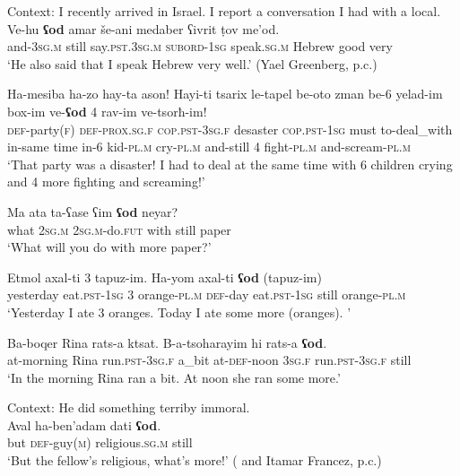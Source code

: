 \pagebreak
\begin{exe}
	\ex\label{exAppendixHebrewOdAdditive1}
	Context: I recently arrived in Israel. I report a conversation I had with a local.\\
	\gll Ve-hu \textbf{ʕod} amar še-ani medaber ʕivrit ṭov me'od.\\
	and-3\textsc{sg}.\textsc{m} still say.\textsc{pst}.3\textsc{sg}.\textsc{m} \textsc{subord}-1\textsc{sg} speak.\textsc{sg}.\textsc{m} Hebrew good very\\
	\glt \lq He also said that I speak Hebrew very well.' (Yael Greenberg, p.c.)

	\ex\label{exAppendixHebrewOdAdditive2}
	\gll Ha-mesiba ha-zo hay-ta ason! Hayi-ti tsarix le-tapel be-oto zman be-6 yelad-im box-im ve-\textbf{ʕod} 4 rav-im ve-tsorħ-im!\\
	\textsc{def}-party(\textsc{f}) \textsc{def}-\textsc{prox}.\textsc{sg}.\textsc{f} \textsc{cop}.\textsc{pst}-3\textsc{sg}.\textsc{f} desaster \textsc{cop}.\textsc{pst}-1\textsc{sg} must to-deal\_with in-same time in-6 kid-\textsc{pl}.\textsc{m} cry-\textsc{pl}.\textsc{m} and-still 4 fight-\textsc{pl}.\textsc{m} and-scream-\textsc{pl}.\textsc{m}\\
	\glt \lq That party was a disaster! I had to deal at the same time with 6 children crying and 4 more fighting and screaming!' \parencite[132]{Greenberg2012}
	
	\ex\label{exAppendixHebrewOdAdditive3}
	\gll Ma ata ta-ʕase ʕim \textbf{ʕod} neyar?\\
	what 2\textsc{sg}.\textsc{m} 2\textsc{sg}.\textsc{m}-do.\textsc{fut} with still paper\\
	\glt \lq What will you do with more paper?\rq{ }\parencite[249]{Glinert1976}
	
	\ex\label{exAppendixHebrewOdAdditive4}
	\gll Etmol axal-ti 3 tapuz-im. Ha-yom axal-ti \textbf{ʕod} (tapuz-im)\\
	yesterday eat.\textsc{pst}-1\textsc{sg} 3 orange-\textsc{pl}.\textsc{m} \textsc{def}-day eat.\textsc{pst}-1\textsc{sg} still \phantom{(}orange-\textsc{pl}.\textsc{m}\\
	\glt \lq Yesterday I ate 3 oranges. Today I ate some more (oranges).
	\rq{ }\parencite[127]{Greenberg2012}
		
	\ex\label{exAppendixHebrewOdAdditive5}
	\gll Ba-boqer Rina rats-a ktsat. B-a-tsoharayim hi rats-a \textbf{ʕod}.\\
	at-morning Rina run.\textsc{pst}-3\textsc{sg}.\textsc{f} a\_bit at-\textsc{def}-noon 3\textsc{sg}.\textsc{f} run.\textsc{pst}-3\textsc{sg}.\textsc{f} still\\
	\glt \lq In the morning Rina ran a bit. At noon she ran some more.\rq{ }\parencite[127]{Greenberg2012}
	
	\ex\label{exAppendixHebrewOdAdditive6}
	Context: He did something terriby immoral.\\
	\gll Aval ha-ben\rq{}adam dati \textbf{ʕod}.\\
	but \textsc{def}-guy(\textsc{m}) religious.\textsc{sg}.\textsc{m} still\\
	\glt \lq But the fellow’s religious, what’s more!\rq{ }(\cite[537]{Glinert1989} and Itamar Francez, p.c.)
\end{exe}
	
